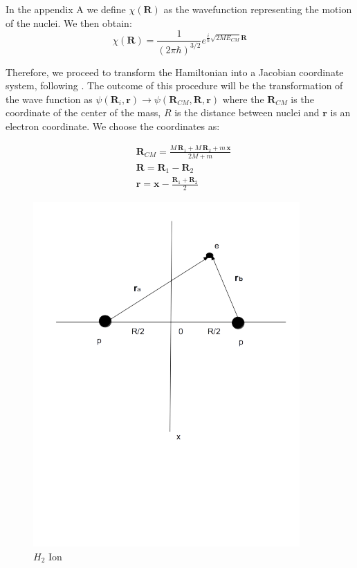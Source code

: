 In the appendix A we define $ \chi(\mathbf{R}) $ as the wavefunction representing the motion of the nuclei. We then  obtain:
\begin{equation}
\chi(\mathbf{R}) = \frac{1}{(2\pi\hbar)^{3/2}}e^{\frac{i}{\hbar}\sqrt{2ME_{CM}}\mathbf{R}}
\end{equation}

Therefore, we proceed to transform the Hamiltonian into a Jacobian coordinate system, following \cite{ZygelmanDalgarno1}. The outcome of this procedure will be the transformation of the wave function as $\psi(\mathbf{R}_i, \mathbf{r}) \rightarrow \psi(\mathbf{R}_{CM}, \mathbf{R}, \mathbf{r}) $ where the $ \mathbf{R}_{CM} $ is the coordinate of the center of the mass, $ R $ is the distance between nuclei and $ \mathbf{r} $ is an electron coordinate.
We choose the coordinates as:

\begin{equation}
\begin{split}
& \mathbf{R}_{CM} = \frac{M\,\mathbf{R}_1 + M\,\mathbf{R}_2 + m\,\mathbf{x}}{2M + m} \\[.8em]
& \mathbf{R} = \mathbf{R}_1 - \mathbf{R}_2 \\[.8em]
& \mathbf{r} = \mathbf{x} - \frac{\mathbf{R}_1 + \mathbf{R}_2}{2}
\end{split}
\end{equation}

\begin{figure}
  \includegraphics{H2Ion3D.png}
  \caption{$ H_2 $ Ion}\label{h2ion3d}
  \label{fig:electronCoordinates}
\end{figure}

